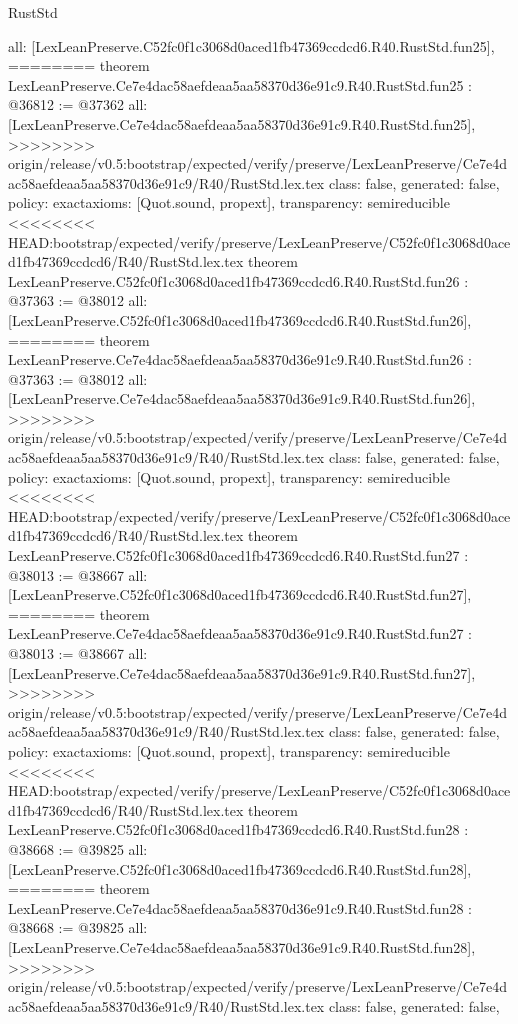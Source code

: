 \begin{lexlean}{RustStd}
\begin{coremodule}
{\begin{coremodule}
{{{{{{{{{{{{{{{{{{{{{{{{{{{{  all: [LexLeanPreserve.C52fc0f1c3068d0aced1fb47369ccdcd6.R40.RustStd.fun25],
========
theorem LexLeanPreserve.Ce7e4dac58aefdeaa5aa58370d36e91c9.R40.RustStd.fun25 : @36812 := @37362 {
  all: [LexLeanPreserve.Ce7e4dac58aefdeaa5aa58370d36e91c9.R40.RustStd.fun25],
>>>>>>>> origin/release/v0.5:bootstrap/expected/verify/preserve/LexLeanPreserve/Ce7e4dac58aefdeaa5aa58370d36e91c9/R40/RustStd.lex.tex
  class: false,
  generated: false,
  policy: exact{axioms: [Quot.sound, propext]},
  transparency: semireducible
}
<<<<<<<< HEAD:bootstrap/expected/verify/preserve/LexLeanPreserve/C52fc0f1c3068d0aced1fb47369ccdcd6/R40/RustStd.lex.tex
theorem LexLeanPreserve.C52fc0f1c3068d0aced1fb47369ccdcd6.R40.RustStd.fun26 : @37363 := @38012 {
  all: [LexLeanPreserve.C52fc0f1c3068d0aced1fb47369ccdcd6.R40.RustStd.fun26],
========
theorem LexLeanPreserve.Ce7e4dac58aefdeaa5aa58370d36e91c9.R40.RustStd.fun26 : @37363 := @38012 {
  all: [LexLeanPreserve.Ce7e4dac58aefdeaa5aa58370d36e91c9.R40.RustStd.fun26],
>>>>>>>> origin/release/v0.5:bootstrap/expected/verify/preserve/LexLeanPreserve/Ce7e4dac58aefdeaa5aa58370d36e91c9/R40/RustStd.lex.tex
  class: false,
  generated: false,
  policy: exact{axioms: [Quot.sound, propext]},
  transparency: semireducible
}
<<<<<<<< HEAD:bootstrap/expected/verify/preserve/LexLeanPreserve/C52fc0f1c3068d0aced1fb47369ccdcd6/R40/RustStd.lex.tex
theorem LexLeanPreserve.C52fc0f1c3068d0aced1fb47369ccdcd6.R40.RustStd.fun27 : @38013 := @38667 {
  all: [LexLeanPreserve.C52fc0f1c3068d0aced1fb47369ccdcd6.R40.RustStd.fun27],
========
theorem LexLeanPreserve.Ce7e4dac58aefdeaa5aa58370d36e91c9.R40.RustStd.fun27 : @38013 := @38667 {
  all: [LexLeanPreserve.Ce7e4dac58aefdeaa5aa58370d36e91c9.R40.RustStd.fun27],
>>>>>>>> origin/release/v0.5:bootstrap/expected/verify/preserve/LexLeanPreserve/Ce7e4dac58aefdeaa5aa58370d36e91c9/R40/RustStd.lex.tex
  class: false,
  generated: false,
  policy: exact{axioms: [Quot.sound, propext]},
  transparency: semireducible
}
<<<<<<<< HEAD:bootstrap/expected/verify/preserve/LexLeanPreserve/C52fc0f1c3068d0aced1fb47369ccdcd6/R40/RustStd.lex.tex
theorem LexLeanPreserve.C52fc0f1c3068d0aced1fb47369ccdcd6.R40.RustStd.fun28 : @38668 := @39825 {
  all: [LexLeanPreserve.C52fc0f1c3068d0aced1fb47369ccdcd6.R40.RustStd.fun28],
========
theorem LexLeanPreserve.Ce7e4dac58aefdeaa5aa58370d36e91c9.R40.RustStd.fun28 : @38668 := @39825 {
  all: [LexLeanPreserve.Ce7e4dac58aefdeaa5aa58370d36e91c9.R40.RustStd.fun28],
>>>>>>>> origin/release/v0.5:bootstrap/expected/verify/preserve/LexLeanPreserve/Ce7e4dac58aefdeaa5aa58370d36e91c9/R40/RustStd.lex.tex
  class: false,
  generated: false,
}}}}}}}}}}}}}}}}}}}}}}}}}}}}}}}}
\end{coremodule}}
\end{coremodule}
\end{lexlean}
